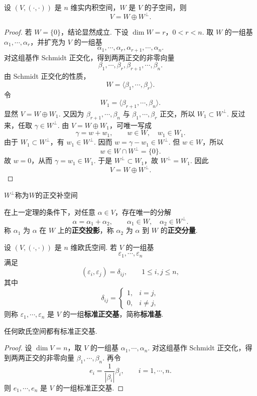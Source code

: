 \begin{theorem}
	设 $(V,(\cdot,\cdot))$ 是 $n$ 维实内积空间，$W$ 是 $V$ 的子空间，则
	\[
	V=W\oplus W^{\perp}.
	\]
\end{theorem}
\begin{proof}
	若 $W=\{0\}$，结论显然成立. 下设 $\dim W=r$，$0<r<n$. 取 $W$ 的一组基 $\alpha_1,\cdots,\alpha_r$，并扩充为 $V$ 的一组基
	\[
	\alpha_1,\cdots,\alpha_r,\alpha_{r+1},\cdots,\alpha_n.
	\]
	对这组基作 Schmidt 正交化，得到两两正交的非零向量
	\[
	\beta_1,\cdots,\beta_r,\beta_{r+1},\cdots,\beta_n.
	\]
	由 Schmidt 正交化的性质，
	\[
	W=\langle\beta_1,\cdots,\beta_r\rangle.
	\]
	令
	\[
	W_1=\langle\beta_{r+1},\cdots,\beta_n\rangle.
	\]
	显然 $V=W\oplus W_1$. 又因为 $\beta_{r+1},\cdots,\beta_n$ 与 $\beta_1,\cdots,\beta_r$ 正交，所以 $W_1\subset W^{\perp}$.
	反过来，任取 $\gamma\in W^{\perp}$. 由 $V=W\oplus W_1$，可唯一写成
	\[
	\gamma=w+w_1,
	\qquad w\in W,
	\quad w_1\in W_1.
	\]
	由于 $W_1\subset W^{\perp}$，有 $w_1\in W^{\perp}$. 因而 $w=\gamma-w_1\in W^{\perp}$. 但 $w\in W$，所以
	\[
	w\in W\cap W^{\perp}=\{0\}.
	\]
	故 $w=0$，从而 $\gamma=w_1\in W_1$. 于是 $W^{\perp}\subset W_1$，故 $W^{\perp}=W_1$. 因此
	\[
	V=W\oplus W^{\perp}.
	\]
\end{proof}
$ W^{\perp}$称为$W$的正交补空间
\begin{definition}
	在上一定理的条件下，对任意 $\alpha\in V$，存在唯一的分解
	\[
	\alpha=\alpha_1+\alpha_2,
	\qquad
	\alpha_1\in W,
	\quad
	\alpha_2\in W^{\perp}.
	\]
	称 $\alpha_1$ 为 $\alpha$ 在 $W$ 上的\textbf{正交投影}，称 $\alpha_2$ 为 $\alpha$ 到 $W$ 的\textbf{正交分量}.
\end{definition}


\begin{definition}
	设 $(V,(\cdot,\cdot))$ 是 $n$ 维欧氏空间. 若 $V$ 的一组基
	\[
	\varepsilon_1,\cdots,\varepsilon_n
	\]
	满足
	\[
	(\varepsilon_i,\varepsilon_j)=\delta_{ij},
	\qquad 1\leqslant i,j\leqslant n,
	\]
	其中
	\[
	\delta_{ij}=\begin{cases}
		1, & i=j,\\
		0, & i\ne j,
	\end{cases}
	\]
	则称 $\varepsilon_1,\cdots,\varepsilon_n$ 是 $V$ 的一组\textbf{标准正交基}，简称\textbf{标准基}.
\end{definition}

\begin{corollary}
	任何欧氏空间都有标准正交基.
\end{corollary}
\begin{proof}
	设 $\dim V=n$，取 $V$ 的一组基 $\alpha_1,\cdots,\alpha_n$. 对这组基作 Schmidt 正交化，得到两两正交的非零向量 $\beta_1,\cdots,\beta_n$. 再令
	\[
	e_i=\frac{1}{|\beta_i|}\beta_i,
	\qquad i=1,\cdots,n.
	\]
	则 $e_1,\cdots,e_n$ 是 $V$ 的一组标准正交基.
\end{proof}


